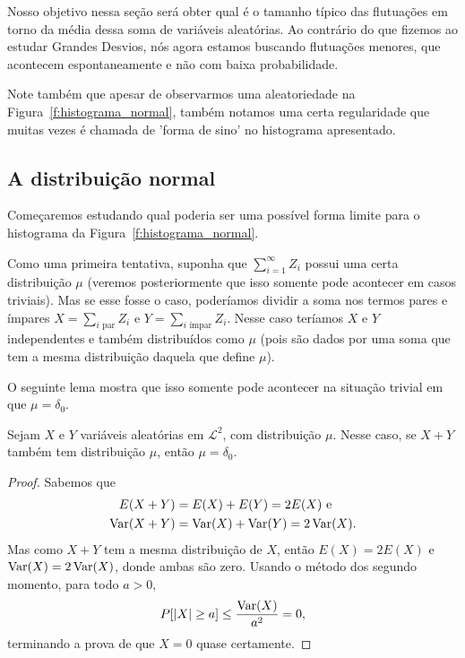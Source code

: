 Nosso objetivo nessa seção será obter qual é o tamanho típico das flutuações em torno da média dessa soma de variáveis aleatórias.
Ao contrário do que fizemos ao estudar Grandes Desvios, nós agora estamos buscando flutuações menores, que acontecem espontaneamente e não com baixa probabilidade.

Note também que apesar de observarmos uma aleatoriedade na Figura~\ref{f:histograma_normal}, também notamos uma certa regularidade que muitas vezes é chamada de 'forma de sino' no histograma apresentado.

\subsection{A distribuição normal}

Começaremos estudando qual poderia ser uma possível forma limite para o histograma da Figura~\ref{f:histograma_normal}.

Como uma primeira tentativa, suponha que $\sum_{i=1}^\infty Z_i$ possui uma certa distribuição $\mu$ (veremos posteriormente que isso somente pode acontecer em casos triviais).
Mas se esse fosse o caso, poderíamos dividir a soma nos termos pares e ímpares $X = \sum_{i \text{ par}} Z_i$ e $Y = \sum_{i \text{ ímpar}} Z_i$.
Nesse caso teríamos $X$ e $Y$ independentes e também distribuídos como $\mu$ (pois são dados por uma soma que tem a mesma distribuição daquela que define $\mu$).

O seguinte lema mostra que isso somente pode acontecer na situação trivial em que $\mu = \delta_0$.

\begin{lemma}
  Sejam $X$ e $Y$ variáveis aleatórias em $\mathcal{L}^2$, \iid com distribuição $\mu$.
  Nesse caso, se $X + Y$ também tem distribuição $\mu$, então $\mu = \delta_0$.
\end{lemma}

\begin{proof}
  Sabemos que
  \begin{equation}
    \begin{split}
      E(X + Y) & = E(X) + E(Y) = 2 E(X) \text{ e}\\
      \operatorname{Var}(X + Y) & = \operatorname{Var}(X) + \operatorname{Var}(Y) = 2 \operatorname{Var}(X).
    \end{split}
  \end{equation}
  Mas como $X + Y$ tem a mesma distribuição de $X$, então $E(X) = 2 E(X)$ e $\operatorname{Var}(X) = 2 \operatorname{Var}(X)$, donde ambas são zero.
  Usando o método dos segundo momento, para todo $a > 0$,
  \begin{equation}
    P[|X| \geq a] \leq \frac{\operatorname{Var}(X)}{a^2} = 0,
  \end{equation}
  terminando a prova de que $X = 0$ quase certamente.
\end{proof}

